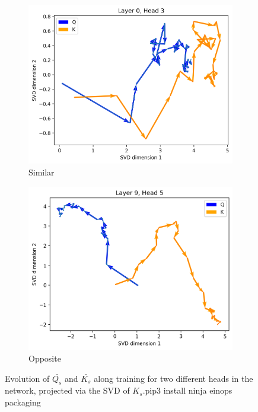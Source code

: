 \begin{figure}[ht!]
    \centering
    \begin{subfigure}[b]{0.48\columnwidth}
         \includegraphics[width=\linewidth]{sources/part_1/anisotropy/imgs/l0h3_samedir_QK_K.png}
         \caption{Similar}
         \label{fig:QK_simdir_K}
    \end{subfigure}
    \begin{subfigure}[b]{0.48\columnwidth}
         \includegraphics[width=\linewidth]{sources/part_1/anisotropy/imgs/l9h5_diffdir_QK_K.png}
         \caption{Opposite}
         \label{fig:QK_diffdir_K}
    \end{subfigure}
    \caption{Evolution of $\bar{Q_s}$ and $\bar{K_s}$ along training for two different heads in the network, projected via the SVD of $K_s$.pip3 install ninja einops packaging
    }
    \label{fig:QK_dir_K}
\end{figure}


